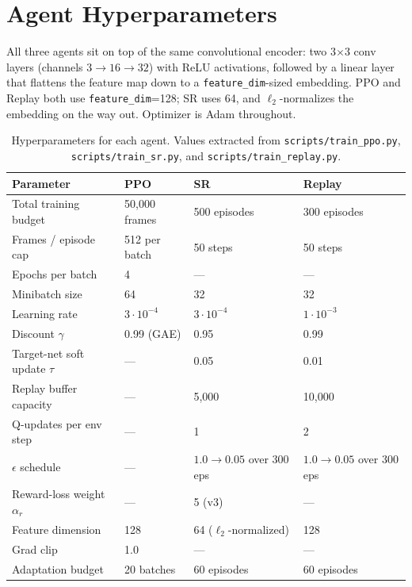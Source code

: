\section{Agent Hyperparameters}
\label{app:hyperparams}

All three agents sit on top of the same convolutional encoder: two 3$\times$3 conv layers (channels $3\rightarrow 16\rightarrow 32$) with ReLU activations, followed by a linear layer that flattens the feature map down to a \texttt{feature\_dim}-sized embedding. PPO and Replay both use \texttt{feature\_dim}=128; SR uses 64, and $\ell_2$-normalizes the embedding on the way out. Optimizer is Adam throughout.

\begin{table}[h]
\centering
\small
\caption{Hyperparameters for each agent. Values extracted from \texttt{scripts/train\_ppo.py}, \texttt{scripts/train\_sr.py}, and \texttt{scripts/train\_replay.py}.}
\label{tab:hyperparams}
\begin{tabular}{@{}l l l l@{}}
\toprule
Parameter & PPO & SR & Replay \\
\midrule
Total training budget & 50{,}000 frames & 500 episodes & 300 episodes \\
Frames / episode cap & 512 per batch & 50 steps & 50 steps \\
Epochs per batch & 4 & --- & --- \\
Minibatch size & 64 & 32 & 32 \\
Learning rate & $3\cdot 10^{-4}$ & $3\cdot 10^{-4}$ & $1\cdot 10^{-3}$ \\
Discount $\gamma$ & 0.99 (GAE) & 0.95 & 0.99 \\
Target-net soft update $\tau$ & --- & 0.05 & 0.01 \\
Replay buffer capacity & --- & 5{,}000 & 10{,}000 \\
Q-updates per env step & --- & 1 & 2 \\
$\epsilon$ schedule & --- & $1.0\rightarrow 0.05$ over 300 eps & $1.0\rightarrow 0.05$ over 300 eps \\
Reward-loss weight $\alpha_r$ & --- & 5 (v3) & --- \\
Feature dimension & 128 & 64 ($\ell_2$-normalized) & 128 \\
Grad clip & 1.0 & --- & --- \\
Adaptation budget & 20 batches & 60 episodes & 60 episodes \\
\bottomrule
\end{tabular}
\end{table}

